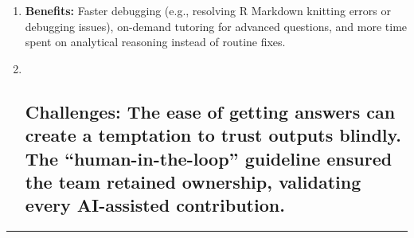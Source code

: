 \documentclass[
]{article}
\begin{document}
\begin{enumerate}
\def\labelenumi{\arabic{enumi}.}
\item
  \textbf{Benefits:} Faster debugging (e.g., resolving R Markdown
  knitting errors or debugging issues), on-demand tutoring for advanced
  questions, and more time spent on analytical reasoning instead of
  routine fixes.
\item ~
  \subsection{\texorpdfstring{\textbf{Challenges:} The ease of getting
  answers can create a temptation to trust outputs blindly. The
  ``human-in-the-loop'' guideline ensured the team retained ownership,
  validating every AI-assisted
  contribution.}{Challenges: The ease of getting answers can create a temptation to trust outputs blindly. The ``human-in-the-loop'' guideline ensured the team retained ownership, validating every AI-assisted contribution.}}\label{challenges-the-ease-of-getting-answers-can-create-a-temptation-to-trust-outputs-blindly.-the-human-in-the-loop-guideline-ensured-the-team-retained-ownership-validating-every-ai-assisted-contribution.}
\end{enumerate}

\begin{center}\rule{0.5\linewidth}{0.5pt}\end{center}
\end{document}
